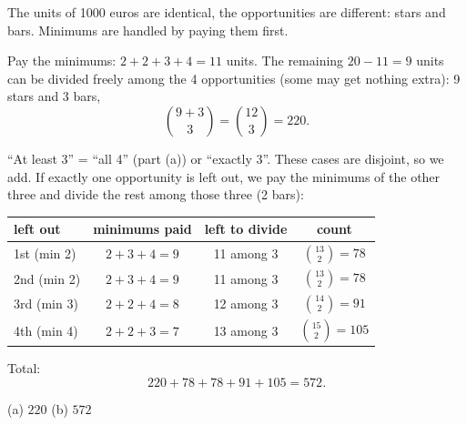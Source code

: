 \begin{solution}
	\idea The units of 1000 euros are identical, the opportunities are
	different: stars and bars. Minimums are handled by paying them first.

	 Pay the minimums: $2+2+3+4=11$ units. The remaining $20-11=9$
	units can be divided freely among the 4 opportunities (some may get nothing
	extra): 9 stars and 3 bars,
	\[ \binom{9+3}{3}=\binom{12}{3}=220. \]

	 ``At least 3'' = ``all 4'' (part (a)) or ``exactly 3''. These
	cases are disjoint, so we add. If exactly one opportunity is left out, we pay
	the minimums of the other three and divide the rest among those three
	(2 bars):
	\begin{center}
		\begin{tabular}{lccc}\toprule
			left out    & minimums paid & left to divide & count               \\\midrule
			1st (min 2) & $2+3+4=9$     & 11 among 3     & $\binom{13}{2}=78$  \\
			2nd (min 2) & $2+3+4=9$     & 11 among 3     & $\binom{13}{2}=78$  \\
			3rd (min 3) & $2+2+4=8$     & 12 among 3     & $\binom{14}{2}=91$  \\
			4th (min 4) & $2+2+3=7$     & 13 among 3     & $\binom{15}{2}=105$ \\\bottomrule
		\end{tabular}
	\end{center}
	Total:
	\[ 220+78+78+91+105=572. \]
	\begin{answer}
		(a) $220$ \qquad (b) $572$
	\end{answer}
\end{solution}
